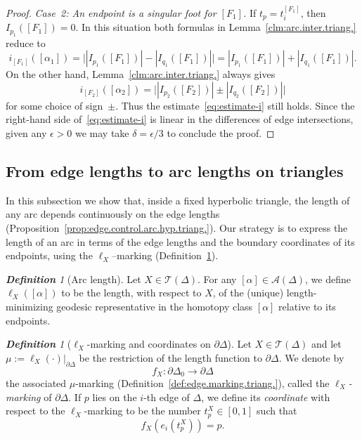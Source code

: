 \documentclass[11pt, letterpaper]{amsart}
\theoremstyle{definition}
\theoremstyle{remark}
\newtheorem{definition}[theorem]{\rm\bf Definition}
\newcommand{\cA}{\mathcal{A}}
\newcommand{\cT}{\mathcal{T}}
\newcommand{\DEF}{} \newcommand{\WARN}{\textcolor{red}} \newcommand{\ALT}{\textcolor{brown}} \newcommand{\TODO}{\textcolor{teal}} %
\numberwithin{equation}{section}
\begin{document}
\begin{proof}
\emph{Case~2: An endpoint is a singular foot for $[F_1]$.}
If $t_p = t_i^{[F_1]}$, then $I_{p_1}([F_1])=0$.
In this situation both formulas in Lemma~\ref{clm:arc.inter.triang.} reduce to
\[
    i_{[F_1]}([\alpha_1])
    = \big||I_{p_1}([F_1])|-|I_{q_1}([F_1])|\big|
    = |I_{p_1}([F_1])|+|I_{q_1}([F_1])|.
\]
On the other hand, Lemma~\ref{clm:arc.inter.triang.} always gives
\[
    i_{[F_2]}([\alpha_2]) = \big||I_{p_2}([F_2])|\pm|I_{q_2}([F_2])|\big|
\]
for some choice of sign~$\pm$.
Thus the estimate~\eqref{eq:estimate-i} still holds.
Since the right-hand side of~\eqref{eq:estimate-i} is linear in the differences
of edge intersections, given any $\epsilon>0$ we may take
$\delta=\epsilon/3$ to conclude the proof.
\end{proof}



\subsection{From edge lengths to arc lengths on triangles}
\label{subsec:hyp.triang.}

In this subsection we show that, inside a fixed hyperbolic triangle, the length of any arc depends continuously on the edge lengths (Proposition~\ref{prop:edge.control.arc.hyp.triang.}).
Our strategy is to express the length of an arc in terms of the edge lengths and the boundary coordinates of its endpoints, using the $\ell_X$–marking (Definition~\ref{def:l-marking}).

\begin{definition}[Arc length]
\label{def:length.arc}
Let $X\in\cT(\Delta)$.
For any $[\alpha]\in\cA(\Delta)$, we define $\ell_X([\alpha])$ to be the length,
with respect to $X$, of the (unique) length-minimizing geodesic representative in the homotopy class $[\alpha]$ relative to its endpoints.
\end{definition}



\begin{definition}[$\ell_X$-marking and coordinates on $\partial \Delta$]
\label{def:l-marking}
Let $X\in\cT(\Delta)$ and let $\mu:=\ell_X(\cdot)\big|_{\partial\Delta}$ be the restriction of the length function to $\partial\Delta$.
We denote by
\[
f_X:\partial\Delta_0\longrightarrow\partial\Delta
\]
the associated $\mu$-marking (Definition~\ref{def:edge.marking.triang.}), called the \DEF{\em $\ell_X$-marking} of $\partial\Delta$.
If $p$ lies on the $i$-th edge of $\Delta$, we define its \DEF{\em coordinate} with respect to the $\ell_X$-marking to be the number $t_p^X\in[0,1]$ such that
\[
f_X(e_i(t_p^X))=p.
\]
\end{definition}
\end{document}
